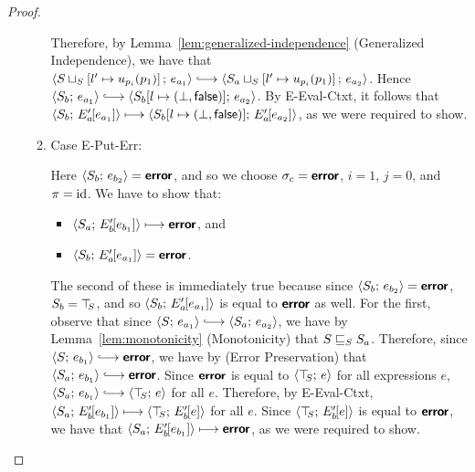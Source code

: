 \begin{proof}
\begin{enumerate}
\begin{enumerate}

      Therefore, by Lemma~\ref{lem:generalized-independence}
      (Generalized Independence), we have that
      $\config{\lubstore{S}{\store{\storebindingRaw{l'}{u_{p_i}(p_1)}}}}{e_{a_1}}
      \parstepsto
      \config{\lubstore{S_a}{\store{\storebindingRaw{l'}{u_{p_i}(p_1)}}}}{e_{a_2}}$.
      Hence $\config{S_b}{e_{a_1}} \parstepsto
      \config{\extS{S_b}{l}{\bot}{\frozenfalse}}{e_{a_2}}$.  By {\sc
        E-Eval-Ctxt}, it follows that
      $\langle S_b;\, E'_a\hspace{-1mm}\left[e_{a_1}\right] \rangle \longmapsto
      \langle S_b[l \mapsto (\bot, \textsf{false})];\, E'_a\hspace{-1mm}\left[e_{a_2}\right] \rangle$,
      as we were required to show.

    \item \label{slqc-new-put-err}Case {\sc E-Put-Err}:

      Here $\langle S_b;\, e_{b_2} \rangle = \textbf{\textsf{error}}$, and so we choose $\sigma_c
      = \textbf{\textsf{error}}$, $i = 1$, $j = 0$, and $\pi = \mathrm{id}$.  We have to show
      that:
      \begin{itemize}
      \item $\langle S_a;\, E'_b\hspace{-1mm}\left[e_{b_1}\right] \rangle \longmapsto
        \textbf{\textsf{error}}$, and
      \item
        $\langle S_b;\, E'_a\hspace{-1mm}\left[e_{a_1}\right] \rangle = \textbf{\textsf{error}}$.
      \end{itemize}

      The second of these is immediately true because since
      $\langle S_b;\, e_{b_2} \rangle = \textbf{\textsf{error}}$, $S_b = \top\hspace{-0.85mm}_{S}$, and so
      $\langle S_b;\, E'_a\hspace{-1mm}\left[e_{a_1}\right] \rangle$ is equal to $\textbf{\textsf{error}}$ as
      well.  For the first, observe that since $\config{S}{e_{a_1}}
      \parstepsto \config{S_a}{e_{a_2}}$, we have by
      Lemma~\ref{lem:monotonicity} (Monotonicity) that
      $S \sqsubseteq_S S_a$.  Therefore, since $\config{S}{e_{b_1}}
      \parstepsto \error$, we have by
      (Error Preservation)
      that $\config{S_a}{e_{b_1}} \parstepsto \error$.  Since $\textbf{\textsf{error}}$
      is equal to $\langle \top\hspace{-0.85mm}_{S};\, e \rangle$ for all expressions $e$,
      $\config{S_a}{e_{b_1}} \parstepsto \config{\topS}{e}$ for all
      $e$.  Therefore, by {\sc E-Eval-Ctxt},
      $\langle S_a;\, E'_b\hspace{-1mm}\left[e_{b_1}\right] \rangle \longmapsto
      \langle \top\hspace{-0.85mm}_{S};\, E'_b\hspace{-1mm}\left[e\right] \rangle$ for all $e$.  Since
      $\langle \top\hspace{-0.85mm}_{S};\, E'_b\hspace{-1mm}\left[e\right] \rangle$ is equal to $\textbf{\textsf{error}}$, we
      have that $\langle S_a;\, E'_b\hspace{-1mm}\left[e_{b_1}\right] \rangle \longmapsto
      \textbf{\textsf{error}}$, as we were required to show.


\end{enumerate}
\end{enumerate}
\end{proof}

